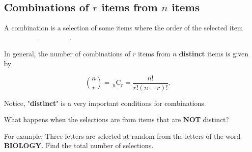 \subsection{Combinations of $r$ items from $n$ items}

A combination is a selection of some items where the order of the selected item $\underline{\hspace{4cm}}$.

\medskip

In general, the number of combinations of $r$ items from $n$ \textbf{distinct} items is given by

\[
 \binom{n}{r}  =        \, _{n}\text{C}_r       =     \frac{n!}{r!(n-r)!}. 
\]

Notice, "\textbf{distinct}" is a very important conditions for combinations.
\medskip

What happens when the selections are from items that are \textbf{NOT} distinct?

\medskip

For example: Three letters are selected at random from the letters of the word \textbf{BIOLOGY}. Find the total number of selections.

\bigskip

\bigskip

 


\exercise  %

